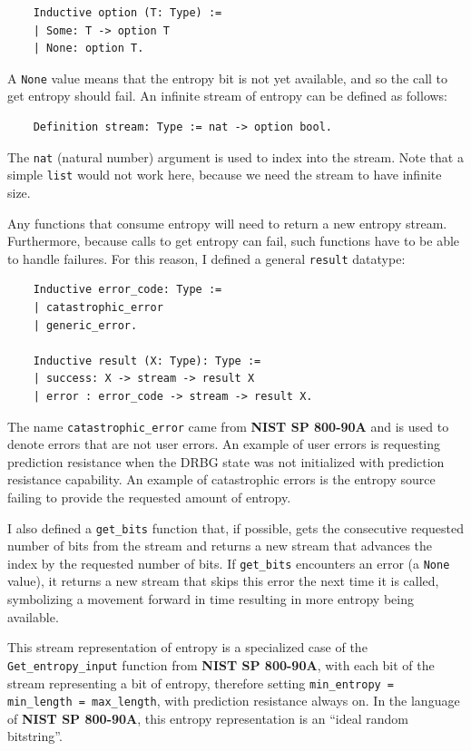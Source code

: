 \documentclass[pageno]{jpaper}
\newcommand{\stdtitle}[1]{\textbf{#1}}
\begin{document}
\begin{lstlisting}
    Inductive option (T: Type) :=
    | Some: T -> option T
    | None: option T.
\end{lstlisting}

A \lstinline{None} value means that the entropy bit is not yet available, and so the call to get entropy should fail. An infinite stream of entropy can be defined as follows:

\begin{lstlisting}
    Definition stream: Type := nat -> option bool.
\end{lstlisting}

The \lstinline{nat} (natural number) argument is used to index into the stream. Note that a simple \lstinline{list} would not work here, because we need the stream to have infinite size.

Any functions that consume entropy will need to return a new entropy stream. Furthermore, because calls to get entropy can fail, such functions have to be able to handle failures. For this reason, I defined a general \lstinline{result} datatype:

\begin{lstlisting}
    Inductive error_code: Type :=
    | catastrophic_error
    | generic_error.

    Inductive result (X: Type): Type :=
    | success: X -> stream -> result X
    | error : error_code -> stream -> result X.
\end{lstlisting}

The name \lstinline{catastrophic_error} came from \stdtitle{NIST SP 800-90A} and is used to denote errors that are not user errors. An example of user errors is requesting prediction resistance when the DRBG state was not initialized with prediction resistance capability. An example of catastrophic errors is the entropy source failing to provide the requested amount of entropy.

I also defined a \lstinline{get_bits} function that, if possible, gets the consecutive requested number of bits from the stream and returns a new stream that advances the index by the requested number of bits. If \lstinline{get_bits} encounters an error (a \lstinline{None} value), it returns a new stream that skips this error the next time it is called, symbolizing a movement forward in time resulting in more entropy being available.

This stream representation of entropy is a specialized case of the \lstinline{Get_entropy_input} function from \stdtitle{NIST SP 800-90A}, with each bit of the stream representing a bit of entropy, therefore setting \lstinline{min_entropy = min_length = max_length}, with prediction resistance always on. In the language of \stdtitle{NIST SP 800-90A}, this entropy representation is an “ideal random bitstring”.
\end{document}
